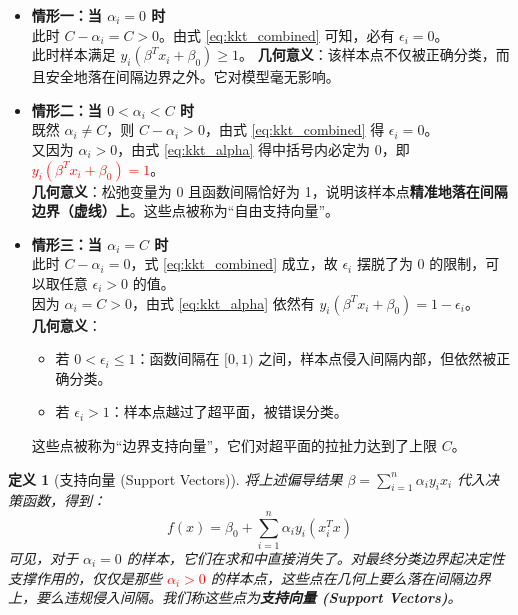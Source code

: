 \documentclass[UTF8]{ctexart}
\newtheorem{definition}[theorem]{定义}
\numberwithin{equation}{section}
\begin{document}
\begin{itemize}
    \item \textbf{情形一：当 $\alpha_i = 0$ 时} \\
    此时 $C - \alpha_i = C > 0$。由式 \eqref{eq:kkt_combined} 可知，必有 $\epsilon_i = 0$。\\
    此时样本满足 $y_i(\beta^T x_i + \beta_0) \ge 1$。
    \textbf{几何意义}：该样本点不仅被正确分类，而且安全地落在间隔边界之外。它对模型毫无影响。

    \item \textbf{情形二：当 $0 < \alpha_i < C$ 时} \\
    既然 $\alpha_i \neq C$，则 $C - \alpha_i > 0$，由式 \eqref{eq:kkt_combined} 得 $\epsilon_i = 0$。\\
    又因为 $\alpha_i > 0$，由式 \eqref{eq:kkt_alpha} 得中括号内必定为 0，即 \textcolor{red}{$y_i(\beta^T x_i + \beta_0) = 1$}。\\
    \textbf{几何意义}：松弛变量为 0 且函数间隔恰好为 1，说明该样本点\textbf{精准地落在间隔边界（虚线）上}。这些点被称为“自由支持向量”。

    \item \textbf{情形三：当 $\alpha_i = C$ 时} \\
    此时 $C - \alpha_i = 0$，式 \eqref{eq:kkt_combined} 成立，故 $\epsilon_i$ 摆脱了为 0 的限制，可以取任意 $\epsilon_i > 0$ 的值。\\
    因为 $\alpha_i = C > 0$，由式 \eqref{eq:kkt_alpha} 依然有 $y_i(\beta^T x_i + \beta_0) = 1 - \epsilon_i$。\\
    \textbf{几何意义}：
    \begin{itemize}
        \item 若 $0 < \epsilon_i \le 1$：函数间隔在 $[0, 1)$ 之间，样本点侵入间隔内部，但依然被正确分类。
        \item 若 $\epsilon_i > 1$：样本点越过了超平面，被错误分类。
    \end{itemize}
    这些点被称为“边界支持向量”，它们对超平面的拉扯力达到了上限 $C$。
\end{itemize}

\begin{definition}[支持向量 (Support Vectors)]
将上述偏导结果 $\beta = \sum_{i=1}^n \alpha_i y_i x_i$ 代入决策函数，得到：
$$ f(x) = \beta_0 + \sum_{i=1}^n \alpha_i y_i (x_i^T x) $$
可见，对于 $\alpha_i = 0$ 的样本，它们在求和中直接消失了。对最终分类边界起决定性支撑作用的，仅仅是那些 \textcolor{red}{$\alpha_i > 0$} 的样本点，这些点在几何上要么落在间隔边界上，要么违规侵入间隔。我们称这些点为\textbf{支持向量 (Support Vectors)}。
\end{definition}
\end{document}
